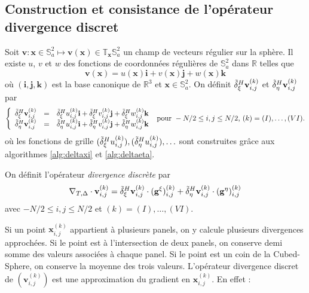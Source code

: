 \subsection{Construction et consistance de l'opérateur divergence discret}

Soit $\mathbf{v} : \mathbf{x} \in \mathbb{S}_a^2 \mapsto \mathbf{v}(\mathbf{x}) \in \mathbb{T}_{\mathbf{x}} \mathbb{S}_a^2$ un champ de vecteurs régulier sur la sphère. Il existe $u$, $v$ et $w$ des fonctions de coordonnées régulières de $\mathbb{S}_a^2$ dans $\mathbb{R}$ telles que
\begin{equation}
\mathbf{v}(\mathbf{x}) = u(\mathbf{x}) \mathbf{i} + v (\mathbf{x}) \mathbf{j} + w(\mathbf{x}) \mathbf{k}
\end{equation}
où $(\mathbf{i}, \mathbf{j}, \mathbf{k})$ est la base canonique de $\mathbb{R}^3$ et $\mathbf{x} \in \mathbb{S}_a^2$. On définit $\tilde{\delta}^H_{\xi} \mathbf{v}_{i,j}^{(k)}$ et $\tilde{\delta}^H_{\eta} \mathbf{v}_{i,j}^{(k)}$ par
\begin{equation}
\left\lbrace
\begin{array}{rcl}
\tilde{\delta}^H_{\xi} \mathbf{v}_{i,j}^{(k)} & = & \tilde{\delta}^H_{\xi} u_{i,j}^{(k)} \mathbf{i} + \tilde{\delta}^H_{\xi} v_{i,j}^{(k)} \mathbf{j} + \tilde{\delta}^H_{\xi} w_{i,j}^{(k)} \mathbf{k} \\
\tilde{\delta}^H_{\eta} \mathbf{v}_{i,j}^{(k)} & = & \tilde{\delta}^H_{\eta} u_{i,j}^{(k)} \mathbf{i} + \tilde{\delta}^H_{\eta} v_{i,j}^{(k)} \mathbf{j} + \tilde{\delta}^H_{\eta} w_{i,j}^{(k)} \mathbf{k}
\end{array}
\right.
\text{ pour } -N/2 \leq  i,j \leq N/2 \text{, } (k) = (I), \ldots, (VI). 
\label{eq:der_partiel_vect}
\end{equation}
où les fonctions de grille $(\tilde{\delta}^H_{\xi} u_{i,j}^{(k)}), (\tilde{\delta}^H_{\eta} u_{i,j}^{(k)}),  \ldots$ sont construites grâce aux algorithmes \ref{alg:deltaxi} et \ref{alg:deltaeta}.

\begin{definition}
On définit l'opérateur \textit{divergence discrète} par 
\begin{equation}
\nabla_{T,\Delta} \cdot \mathbf{v}_{i,j}^{(k)} = \tilde{\delta}^H_{\xi} \mathbf{v}_{i,j}^{(k)} \cdot ( \mathbf{g}^{\xi} )_{i,j}^{(k)} + \tilde{\delta}^H_{\eta} \mathbf{v}_{i,j}^{(k)} \cdot ( \mathbf{g}^{\eta} )_{i,j}^{(k)}
\end{equation}
avec $-N/2 \leq i,j \leq N/2$ et $(k) = (I), \ldots , (VI)$.
\label{def:divergence_disc}
\end{definition}
Si un point $\mathbf{x}_{i,j}^{(k)}$ appartient à plusieurs panels, on y calcule plusieurs divergences approchées. Si le point est à l'intersection de deux panels, on conserve demi somme des valeurs associées à chaque panel. Si le point est un coin de la Cubed-Sphere, on conserve la moyenne des trois valeurs.
L'opérateur divergence discret de $(\mathbf{v}_{i,j}^{(k)})$ est une approximation du gradient en $\mathbf{x}_{i,j}^{(k)}$. En effet :

